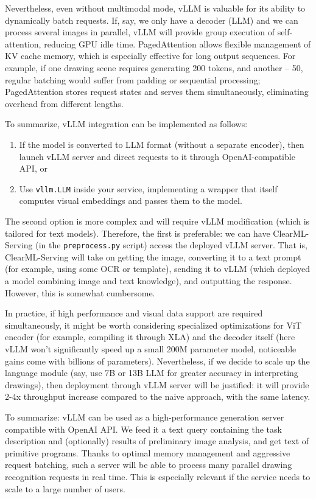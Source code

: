 \documentclass{article}
\begin{document}
Nevertheless, even without multimodal mode, vLLM is valuable for its ability to dynamically batch requests. If, say, we only have a decoder (LLM) and we can process several images in parallel, vLLM will provide group execution of self-attention, reducing GPU idle time. PagedAttention allows flexible management of KV cache memory, which is especially effective for long output sequences. For example, if one drawing scene requires generating 200 tokens, and another – 50, regular batching would suffer from padding or sequential processing; PagedAttention stores request states and serves them simultaneously, eliminating overhead from different lengths.

To summarize, vLLM integration can be implemented as follows:
\begin{enumerate}
\item If the model is converted to LLM format (without a separate encoder), then launch vLLM server and direct requests to it through OpenAI-compatible API, or
\item Use \texttt{vllm.LLM} inside your service, implementing a wrapper that itself computes visual embeddings and passes them to the model.
\end{enumerate}
The second option is more complex and will require vLLM modification (which is tailored for text models). Therefore, the first is preferable: we can have ClearML-Serving (in the \texttt{preprocess.py} script) access the deployed vLLM server. That is, ClearML-Serving will take on getting the image, converting it to a text prompt (for example, using some OCR or template), sending it to vLLM (which deployed a model combining image and text knowledge), and outputting the response. However, this is somewhat cumbersome.

In practice, if high performance and visual data support are required simultaneously, it might be worth considering specialized optimizations for ViT encoder (for example, compiling it through XLA) and the decoder itself (here vLLM won't significantly speed up a small 200M parameter model, noticeable gains come with billions of parameters). Nevertheless, if we decide to scale up the language module (say, use 7B or 13B LLM for greater accuracy in interpreting drawings), then deployment through vLLM server will be justified: it will provide 2-4x throughput increase compared to the naive approach, with the same latency.

To summarize: vLLM can be used as a high-performance generation server compatible with OpenAI API. We feed it a text query containing the task description and (optionally) results of preliminary image analysis, and get text of primitive programs. Thanks to optimal memory management and aggressive request batching, such a server will be able to process many parallel drawing recognition requests in real time. This is especially relevant if the service needs to scale to a large number of users.
\end{document}
